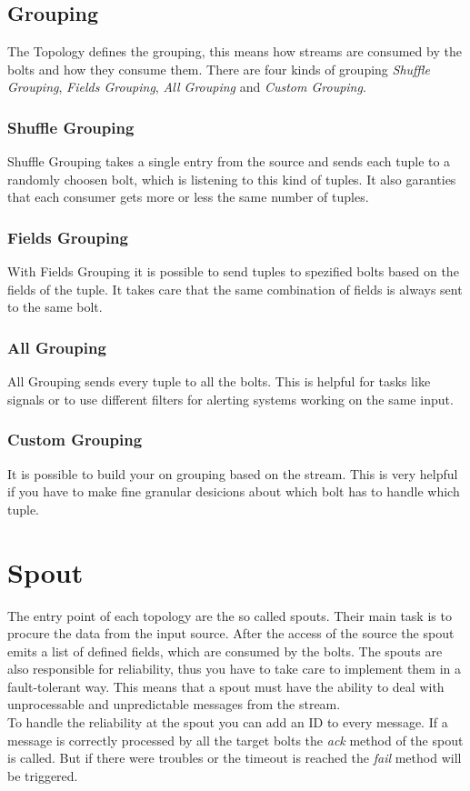 \subsection{Grouping}
The Topology defines the grouping, this means how streams are consumed by the bolts and how they consume them.
There are four kinds of grouping \textit{Shuffle Grouping}, \textit{Fields Grouping},
\textit{All Grouping} and \textit{Custom Grouping}.

\subsubsection{Shuffle Grouping}
Shuffle Grouping takes a single entry from the source and sends each tuple to a randomly choosen bolt,
which is listening to this kind of tuples. It also garanties that each consumer gets more or less the same number of tuples.

\subsubsection{Fields Grouping}
With Fields Grouping it is possible to send tuples to spezified bolts based on the fields of the tuple.
It takes care that the same combination of fields is always sent to the same bolt.

\subsubsection{All Grouping}
All Grouping sends every tuple to all the bolts. This is helpful for tasks like signals or to
use different filters for alerting systems working on the same input.

\subsubsection{Custom Grouping}
It is possible to build your on grouping based on the stream. This is very helpful if you have to make
fine granular desicions about which bolt has to handle which tuple.


\newpage

\section{Spout}
The entry point of each topology are the so called spouts. Their main task is to procure the data from the input source.
After the access of the source the spout emits a list of defined fields, which are consumed by the bolts.
The spouts are also responsible for reliability,
thus you have to take care to implement them in a fault-tolerant way. This means that a spout must have the
ability to deal with unprocessable and unpredictable messages from the stream.\\
To handle the reliability at the spout you can add an ID to every message. If a message is correctly processed  by
all the target bolts the \textit{ack} method of the spout is called. But if there were troubles or the timeout is
reached the \textit{fail} method will be triggered.

